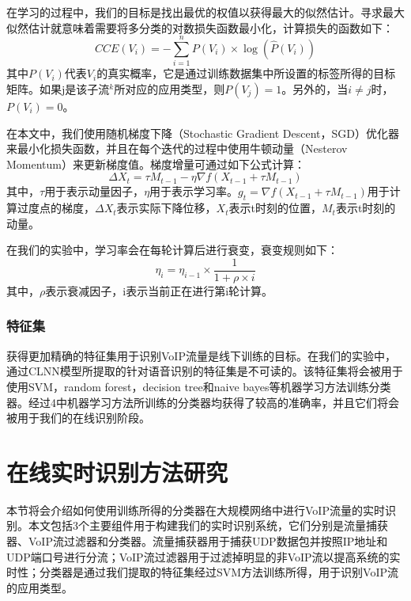 在学习的过程中，我们的目标是找出最优的权值以获得最大的似然估计。寻求最大似然估计就意味着需要将多分类的对数损失函数最小化，计算损失的函数如下：
\begin{equation}
CCE({V_i}) =  - \sum\limits_{i = 1}^n {P({V_i}) \times \log (\hat P({V_i}))}
\end{equation}
其中$P({V_i})$代表${V_i}$的真实概率，它是通过训练数据集中所设置的标签所得的目标矩阵。如果j是该子流$^k$所对应的应用类型，则$P({V_j})=1$。另外的，当$i \ne j$时，$P({V_i})=0$。

在本文中，我们使用随机梯度下降（Stochastic Gradient Descent，SGD）优化器来最小化损失函数，并且在每个迭代的过程中使用牛顿动量（Nesterov Momentum）来更新梯度值。梯度增量可通过如下公式计算：
\begin{equation}
\Delta {X_t} = \tau {M_{t - 1}} - \eta \nabla f({X_{t - 1}} + \tau {M_{t - 1}})
\end{equation}
其中，${\tau}$用于表示动量因子，${\eta}$用于表示学习率。${g_t} = \nabla f({X_{t - 1}} + \tau {M_{t - 1}})$用于计算过度点的梯度，$\Delta {X_t}$表示实际下降位移，${X_t}$表示t时刻的位置，${M_t}$表示t时刻的动量。

在我们的实验中，学习率会在每轮计算后进行衰变，衰变规则如下：
\begin{equation}
\label{equ:decay}
{\eta _i} = {\eta _{i - 1}} \times \frac{1}{{1 + \rho  \times i}}
\end{equation}
其中，${\rho }$表示衰减因子，i表示当前正在进行第i轮计算。

\subsubsection{特征集}
获得更加精确的特征集用于识别VoIP流量是线下训练的目标。在我们的实验中，通过CLNN模型所提取的针对语音识别的特征集是不可读的。该特征集将会被用于使用SVM，random forest，decision tree和naive bayes等机器学习方法训练分类器。经过4中机器学习方法所训练的分类器均获得了较高的准确率，并且它们将会被用于我们的在线识别阶段。

\section{在线实时识别方法研究}
\label{sec:onlineidentification}
本节将会介绍如何使用训练所得的分类器在大规模网络中进行VoIP流量的实时识别。本文包括3个主要组件用于构建我们的实时识别系统，它们分别是流量捕获器、VoIP流过滤器和分类器。流量捕获器用于捕获UDP数据包并按照IP地址和UDP端口号进行分流；VoIP流过滤器用于过滤掉明显的非VoIP流以提高系统的实时性；分类器是通过我们提取的特征集经过SVM方法训练所得，用于识别VoIP流的应用类型。

